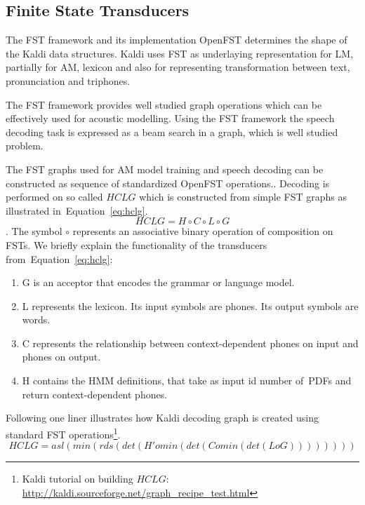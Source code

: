 \subsection{Finite State Transducers} 
\label{sec:fst}
The \acl{FST} framework and its implementation OpenFST determines the shape of the Kaldi data structures.
Kaldi uses \ac{FST} as underlaying representation for \ac{LM}, partially for \ac{AM}, lexicon and also for representing transformation between text, pronunciation and triphones.

The \ac{FST} framework provides well studied graph operations\cite{mohri2002weighted} which can be effectively used for acoustic modelling.
Using the \ac{FST} framework the speech decoding task is expressed as a beam search in a graph, which is well studied problem.

The \ac{FST} graphs used for \ac{AM} model training and speech decoding can be constructed as sequence of standardized OpenFST operations.\cite{mohri2002weighted}.
Decoding is performed on so called  $HCLG$ which is constructed from simple \ac{FST} graphs as illustrated in~Equation~\ref{eq:hclg}. 
\begin{equation} \label{eq:hclg}
HCLG = H\circ C\circ L\circ G
\end{equation}.
The symbol $\circ$ represents an associative binary operation of composition on \acp{FST}.
We briefly explain the functionality of the transducers from~Equation~\ref{eq:hclg}:
\begin{enumerate}
    \item G is an acceptor that encodes the grammar or language model.
    \item L represents the lexicon. Its input symbols are phones. Its output symbols are words.
    \item C represents the relationship between context-dependent phones on input and phones on output.
    \item H contains the \ac{HMM} definitions, that take as input id number of~\acp{PDF} and return context-dependent phones.
\end{enumerate}

Following one liner illustrates how Kaldi decoding graph is created using standard \ac{FST} operations\footnote{Kaldi tutorial on building $HCLG$: \url{http://kaldi.sourceforge.net/graph_recipe_test.html}}.\cite{mohri2002weighted}
\begin{equation}
   HCLG = asl(min(rds(det(H' o min(det(C o min(det(L o G)))))))) 
\end{equation}

